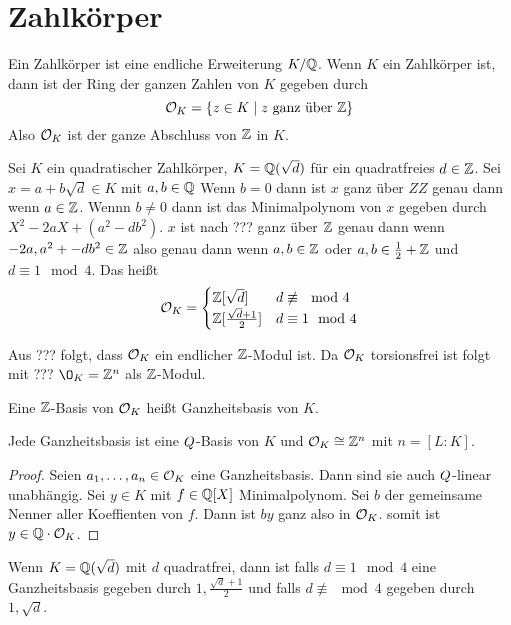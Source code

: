 \section{Zahlkörper}
\begin{Def}
    Ein Zahlkörper ist eine endliche Erweiterung \(K/\mathbb{Q}\). Wenn \(K\) ein Zahlkörper ist, dann
    ist der Ring der ganzen Zahlen von \(K\) gegeben durch
    \[\mathcal{O}_K=\{z\in K\mid z \text{ ganz über }\mathbb{Z}\}\]
    Also \(\mathcal{O}_K\) ist der ganze Abschluss von \(\mathbb{Z}\) in \(K\).
\end{Def}
\begin{Bsp}
    Sei \(K\) ein quadratischer Zahlkörper, \(K=\mathbb{Q}(\sqrt{d})\) für ein quadratfreies \(d\in \mathbb{Z}\).
    Sei \(x=a+b\sqrt{d}\in K\) mit \(a,b\in \mathbb{Q}\)
    Wenn \(b=0\) dann ist \(x\) ganz über \(ZZ\) genau dann wenn \(a\in \mathbb{Z}\).
    Wennn \(b\neq 0\) dann ist das Minimalpolynom von \(x\) gegeben durch 
    \(X^2-2aX+(a^2-db^2)\).
    \(x\) ist nach ??? ganz über \(\mathbb{Z}\) genau dann wenn \(-2a, a^2+-db^2\in \mathbb{Z}\) also genau dann
    wenn \(a,b\in \mathbb{Z}\) oder \(a,b\in \frac 1 2+\mathbb{Z}\) und \(d\equiv 1 \mod 4\).
    Das heißt \[\mathcal{O}_K=\begin{cases}
        \mathbb{Z}[\sqrt{d}] & d\not\equiv \mod 4\\
        \mathbb{Z}[\frac{\sqrt{d}+1}{2}] & d\equiv 1 \mod 4
    \end{cases}\]
\end{Bsp}
\begin{Bem}
    Aus ??? folgt, dass \(\mathcal{O}_K\) ein endlicher \(\mathbb{Z}\)-Modul ist.
    Da \(\mathcal{O}_K\) torsionsfrei ist folgt mit ???
    \(\O_K=\ZZ^n\) als \(\mathbb{Z}\)-Modul.
\end{Bem}
\begin{Def} Eine \(\mathbb{Z}\)-Basis von \(\mathcal{O}_K\) heißt Ganzheitsbasis von \(K\).
\end{Def}
\begin{Lemma}
    Jede Ganzheitsbasis ist eine \(\\Q\)-Basis von \(K\) und \(\mathcal{O}_K\cong \mathbb{Z}^n\) mit 
    \(n=[L:K]\).
\end{Lemma}
\begin{proof}
    Seien \(a_1,\dots,a_n\in\mathcal{O}_K\) eine Ganzheitsbasis.
    Dann sind sie auch \(\\Q\)-linear unabhängig.
    Sei \(y\in K\) mit \(f\in \mathbb{Q}[X]\) Minimalpolynom.
    Sei \(b\) der gemeinsame Nenner aller Koeffienten von \(f\).
    Dann ist \(by\) ganz also in \(\mathcal{O}_K\).
    somit ist \(y\in \mathbb{Q}\cdot \mathcal{O}_K\).
\end{proof}
\begin{Bsp}
    Wenn \(K=\mathbb{Q}(\sqrt{d})\) mit \(d\) quadratfrei, dann ist
    falls \(d\equiv 1 \mod 4\) eine Ganzheitsbasis gegeben durch 
    \(1,\frac{\sqrt{d}+1}{2}\) und falls \(d\not\equiv \mod 4\) gegeben durch 
    \(1,\sqrt{d}\).
\end{Bsp}
